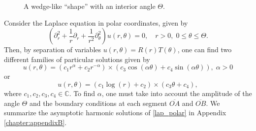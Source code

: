 \begin{figure}[H]
\centering
{}
\caption{A wedge-like ``shape'' with an interior angle \(\Theta\).}\label{wedge}
\end{figure}
Consider the Laplace equation in polar coordinates, given by
\begin{equation}\label{lap_polar}
    \left(\partial_r^2 + \frac{1}{r} \partial_r +\frac{1}{r^2}\partial_\theta^2\right)u(r,\theta) = 0, \quad r>0, \; 0 \leq \theta \leq \Theta.
\end{equation}
Then, by separation of variables \(u(r, \theta) = R(r) T(\theta)\), one can find two different families of particular solutions given by
\[
    u(r,\theta) = \left(c_1 r^\alpha + c_2 r^{-\alpha}\right) \times \left(c_3 \cos(\alpha \theta) + c_4 \sin(\alpha \theta)\right), \; \alpha >0
\]
or
\[
    u(r,\theta) = \left(c_1 \log (r) + c_2 \right) \times \left(c_3 \theta + c_4 \right), 
\]
where \(c_1, c_2, c_3, c_4 \in \mathbb{C}\). To find \(\alpha\), one must take into account the amplitude of the angle \(\Theta\) and the boundary conditions at each segment \(\overline{OA}\) and \(\overline{OB}\). We summarize the asymptotic harmonic solutions of \eqref{lap_polar} in Appendix \ref{chapter:appendixB}. 
